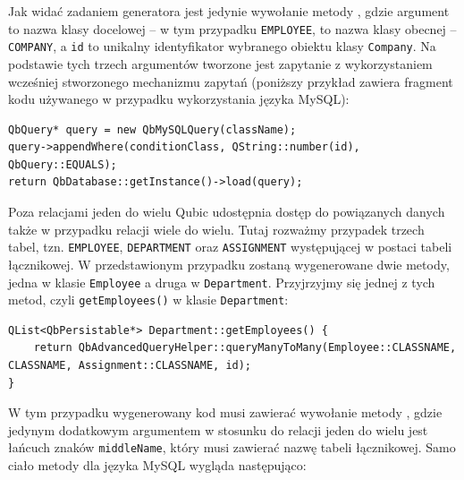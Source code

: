 \documentclass[12pt]{report}
\begin{document}
Jak widać zadaniem generatora jest jedynie wywołanie metody , gdzie argument  to 
nazwa klasy docelowej -- w tym przypadku {\tt EMPLOYEE},  to nazwa klasy obecnej -- {\tt COMPANY}, a {\tt id} to unikalny identyfikator 
wybranego obiektu klasy {\tt Company}. Na podstawie tych trzech argumentów tworzone jest zapytanie z wykorzystaniem wcześniej stworzonego mechanizmu zapytań 
(poniższy przykład zawiera fragment kodu używanego w przypadku wykorzystania języka MySQL):

\begin{lstlisting}[style=customc,caption=Zapytanie dostępu do powiązanych danych (jeden do wielu)]
QbQuery* query = new QbMySQLQuery(className);
query->appendWhere(conditionClass, QString::number(id), QbQuery::EQUALS);
return QbDatabase::getInstance()->load(query);
\end{lstlisting}

Poza relacjami jeden do wielu Qubic udostępnia dostęp do powiązanych danych także w przypadku relacji wiele do wielu. Tutaj rozważmy przypadek trzech tabel, tzn.
{\tt EMPLOYEE}, {\tt DEPARTMENT} oraz {\tt ASSIGNMENT} występującej w postaci tabeli łącznikowej. W przedstawionym przypadku zostaną wygenerowane dwie metody,
jedna w klasie {\tt Employee} a druga w {\tt Department}. Przyjrzyjmy się jednej z tych metod, czyli {\tt getEmployees()} w klasie {\tt Department}:

\begin{lstlisting}[style=customc,caption=Ciało metody dostępu do powiązanych danych (wiele do wielu)]
QList<QbPersistable*> Department::getEmployees() {
    return QbAdvancedQueryHelper::queryManyToMany(Employee::CLASSNAME, CLASSNAME, Assignment::CLASSNAME, id);
}
\end{lstlisting}

W tym przypadku wygenerowany kod musi zawierać wywołanie metody , gdzie jedynym dodatkowym
argumentem w stosunku do relacji jeden do wielu jest łańcuch znaków {\tt middleName}, który musi zawierać nazwę tabeli łącznikowej. Samo ciało metody dla języka MySQL
wygląda następująco:
\end{document}
